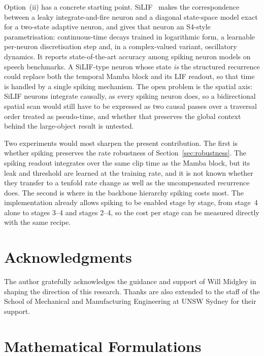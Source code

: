 \documentclass[11pt, a4paper]{report}
\begin{document}
Option~(ii) has a concrete starting point. SiLIF~\cite{fabre2025silif} makes the correspondence between a
leaky integrate-and-fire neuron and a diagonal state-space model exact for a two-state adaptive neuron, and
gives that neuron an S4-style parametrisation: continuous-time decays trained in logarithmic form, a
learnable per-neuron discretisation step and, in a complex-valued variant, oscillatory dynamics. It reports
state-of-the-art accuracy among spiking neuron models on speech benchmarks. A SiLIF-type neuron whose state
\emph{is} the structured recurrence could replace both the temporal Mamba block and its LIF readout, so that
time is handled by a single spiking mechanism. The open problem is the spatial axis: SiLIF neurons
integrate causally, as every spiking neuron does, so a bidirectional spatial scan would still have to be
expressed as two causal passes over a traversal order treated as pseudo-time, and whether that preserves
the global context behind the large-object result is untested.

Two experiments would most sharpen the present contribution. The first is whether spiking preserves the
rate robustness of Section~\ref{sec:robustness}. The spiking readout integrates over the same clip time as
the Mamba block, but its leak and threshold are learned at the training rate, and it is not known whether
they transfer to a tenfold rate change as well as the uncompensated recurrence does. The second is where in
the backbone hierarchy spiking costs most. The implementation already allows spiking to be enabled stage by
stage, from stage~4 alone to stages 3--4 and stages 2--4, so the cost per stage can be measured directly
with the same recipe.

\chapter*{Acknowledgments}
The author gratefully acknowledges the guidance and support of Will Midgley in shaping the direction of
this research. Thanks are also extended to the staff of the School of Mechanical and Manufacturing
Engineering at UNSW Sydney for their support.

\appendix

\chapter{Mathematical Formulations}
\label{app:maths}
\end{document}

